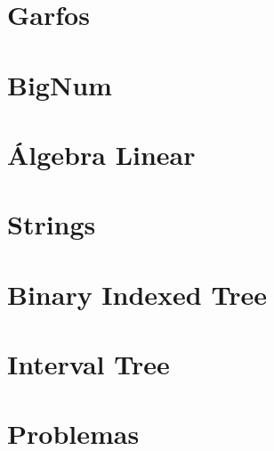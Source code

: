 \documentclass[oneside, landscape, twocolumn, a4wide, 9pt]{scrartcl}
\begin{document}
\section{Garfos}

\section{BigNum}

\section{Álgebra Linear}

\section{Strings}

\section{Binary Indexed Tree}

\section{Interval Tree}

\section{Problemas}


\end{document}
